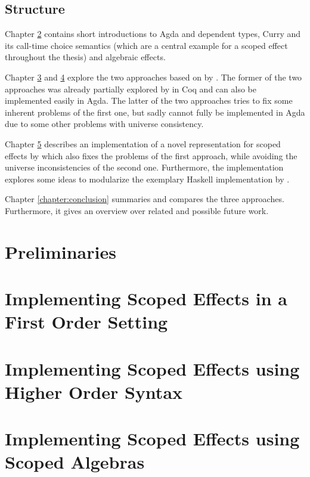 \documentclass[10pt,a4paper,twoside,notitlepage]{report}
\begin{document}
\section{Structure}

Chapter \ref{chapter:preliminaries} contains short introductions to Agda and
dependent types, Curry and its call-time choice semantics (which are a central
example for a scoped effect throughout the thesis) and algebraic effects.

Chapter \ref{chapter:first-order} and \ref{chapter:higher-order} explore the two
approaches based on  by
\textcite{DBLP:conf/haskell/WuSH14}.
The former of the two approaches was already partially explored by
\textcite{bunkenburg2019modeling} in Coq and can also be implemented
easily in Agda.
The latter of the two approaches tries to fix some inherent problems of the
first one, but sadly cannot fully be implemented in Agda due to some other
problems with universe consistency.

Chapter \ref{chapter:scoped-algebras} describes an implementation of a novel
representation for scoped effects by \textcite{DBLP:conf/lics/PirogSWJ18} which
also fixes the problems of the first approach, while avoiding the universe
inconsistencies of the second one.
Furthermore, the implementation explores some ideas to modularize the exemplary
Haskell implementation by \citeauthor{DBLP:conf/lics/PirogSWJ18}.

Chapter \ref{chapter:conclusion} summaries and compares the three approaches.
Furthermore, it gives an overview over related and possible future work.

\chapter{Preliminaries}
\label{chapter:preliminaries}


\chapter{Implementing Scoped Effects in a First Order Setting}
\label{chapter:first-order}


\chapter{Implementing Scoped Effects using Higher Order Syntax}
\label{chapter:higher-order}


\chapter{Implementing Scoped Effects using Scoped Algebras}
\label{chapter:scoped-algebras}

\end{document}
